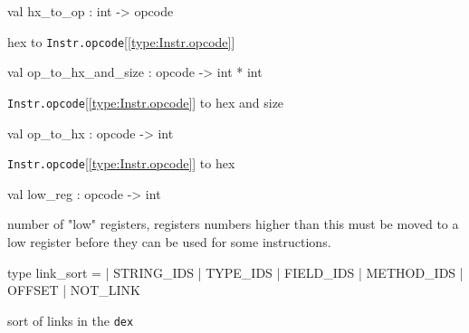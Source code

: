 \documentclass[11pt]{article}
\begin{document}
\label{val:Instr.hx-underscoreto-underscoreop}\begin{ocamldoccode}
val hx_to_op : int -> opcode
\end{ocamldoccode}
\begin{ocamldocdescription}
hex to {\tt{Instr.opcode}}[\ref{type:Instr.opcode}]


\end{ocamldocdescription}




\label{val:Instr.op-underscoreto-underscorehx-underscoreand-underscoresize}\begin{ocamldoccode}
val op_to_hx_and_size : opcode -> int * int
\end{ocamldoccode}
\begin{ocamldocdescription}
{\tt{Instr.opcode}}[\ref{type:Instr.opcode}] to hex and size


\end{ocamldocdescription}




\label{val:Instr.op-underscoreto-underscorehx}\begin{ocamldoccode}
val op_to_hx : opcode -> int
\end{ocamldoccode}
\begin{ocamldocdescription}
{\tt{Instr.opcode}}[\ref{type:Instr.opcode}] to hex


\end{ocamldocdescription}




\label{val:Instr.low-underscorereg}\begin{ocamldoccode}
val low_reg : opcode -> int
\end{ocamldoccode}
\begin{ocamldocdescription}
number of "low" registers, registers numbers higher 
 than this must be moved to a low register before they 
 can be used for some instructions.


\end{ocamldocdescription}




\label{type:Instr.link-underscoresort}\begin{ocamldoccode}
type link_sort =
  | STRING_IDS
  | TYPE_IDS
  | FIELD_IDS
  | METHOD_IDS
  | OFFSET
  | NOT_LINK
\end{ocamldoccode}
\begin{ocamldocdescription}
sort of links in the {\tt{dex}}


\end{ocamldocdescription}
\end{document}
